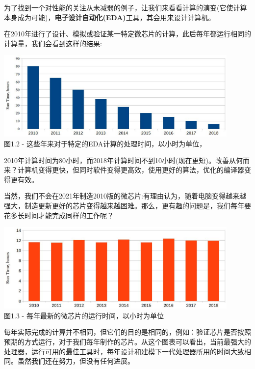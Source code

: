 
为了找到一个对性能的关注从未减弱的例子，让我们来看看计算的演变(它使计算本身成为可能)，\textbf{电子设计自动化(EDA)}工具，其会用来设计计算机。

在2010年进行了设计、模拟或验证某一特定微芯片的计算，此后每年都运行相同的计算量，我们会看到这样的结果:

\begin{center}
\includegraphics[width=0.9\textwidth]{content/1/chapter1/images/2.jpg}\\
图1.2 - 这些年来对于特定的EDA计算的处理时间，以小时为单位，
\end{center}

2010年计算时间为80小时，而2018年计算时间不到10小时(现在更短)。改善从何而来？计算机变得更快，但同时软件变得更高效，使用更好的算法，优化的编译器变得更有效。

当然，我们不会在2021年制造2010版的微芯片:有理由认为，随着电脑变得越来越强大，制造更新更好的芯片变得越来越困难。那么，更有趣的问题是，我们每年要花多长时间才能完成同样的工作呢？

\begin{center}
\includegraphics[width=0.9\textwidth]{content/1/chapter1/images/3.jpg}\\
图1.3 - 每年最新的微芯片的运行时间，以小时为单位
\end{center}

每年实际完成的计算并不相同，但它们的目的是相同的，例如：验证芯片是否按照预期的方式运行，对于我们每年制作的芯片。从这个图表可以看出，当前最强大的处理器，运行可用的最佳工具时，每年设计和建模下一代处理器所用的时间大致相同。虽然我们还在努力，但没有任何进展。

